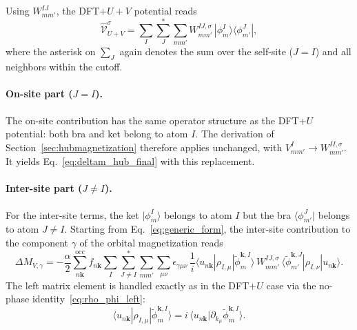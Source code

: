 \documentclass[11pt]{article}
\begin{document}
Using $W_{mm'}^{IJ}$, the DFT$+U+V$ potential reads
\begin{equation}
  \hat{\mathcal{V}}_{U+V}^{\sigma}
  =
  \sum_{I}\sum_{J}^{*}\sum_{mm'}
  W_{mm'}^{IJ,\sigma}\,
  |\phi^{I}_{m}\rangle\langle\phi^{J}_{m'}|,
  \label{eq:Vuv_compact}
\end{equation}
where the asterisk on $\sum_J$ again denotes the sum over the self-site
($J=I$) and all neighbors within the cutoff.

\paragraph{On-site part ($J=I$).}
The on-site contribution has the same operator structure as the
DFT$+U$ potential: both bra and ket belong to atom $I$.  The
derivation of Section~\ref{sec:hubmagnetization} therefore applies
unchanged, with $V_{mm'}^I \to W_{mm'}^{II,\sigma}$.  It yields
Eq.~\eqref{eq:deltam_hub_final} with this replacement.

\paragraph{Inter-site part ($J\ne I$).}
For the inter-site terms, the ket $|\phi^I_m\rangle$ belongs to atom
$I$ but the bra $\langle\phi^J_{m'}|$ belongs to atom $J\ne I$.
Starting from Eq.~\eqref{eq:generic_form}, the inter-site contribution
to the component $\gamma$ of the orbital magnetization reads
\begin{equation}
  \Delta M_{V,\gamma}
  =
  -\frac{\alpha}{2}
  \sum_{n\mathbf{k}}^{\mathrm{occ}}f_{n\mathbf{k}}
  \sum_{I}\sum_{J\ne I}^{*}\sum_{mm'}\sum_{\mu\nu}
  \epsilon_{\gamma\mu\nu}\,\frac{1}{i}
  \langle u_{n\mathbf{k}}|\rho_{I,\mu}|\widetilde\phi^{\mathbf{k},I}_{m}\rangle
  \,W_{mm'}^{IJ,\sigma}\,
  \langle\widetilde\phi^{\mathbf{k},J}_{m'}|\rho_{I,\nu}|u_{n\mathbf{k}}\rangle.
  \label{eq:deltaM_V_components}
\end{equation}
The left matrix element is handled exactly as in the DFT$+U$ case via
the no-phase identity~\eqref{eq:rho_phi_left}:
\begin{equation}
  \langle u_{n\mathbf{k}}|\rho_{I,\mu}|\widetilde\phi^{\mathbf{k},I}_{m}\rangle
  =
  i\,\langle u_{n\mathbf{k}}|\partial_{k_\mu}\widetilde\phi^{\mathbf{k},I}_{m}\rangle.
  \label{eq:left_I}
\end{equation}
\end{document}
